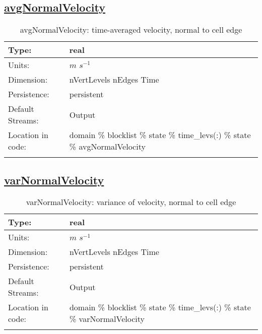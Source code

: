 \subsection[avgNormalVelocity]{\hyperref[sec:var_tab_state]{avgNormalVelocity}}
\label{subsec:var_sec_state_avgNormalVelocity}
\begin{center}
\begin{longtable}{| p{2.0in} | p{4.0in} |}
        \hline 
        Type: & real \\
        \hline 
        Units: & $m$ $s^{-1}$ \\
        \hline 
        Dimension: & nVertLevels nEdges Time \\
        \hline 
        Persistence: & persistent \\
        \hline 
		 Default Streams: & Output  \\
        \hline 
		 Location in code: & domain \% blocklist \% state \% time\_levs(:) \% state \% avgNormalVelocity \\
		 \hline 
    \caption{avgNormalVelocity: time-averaged velocity, normal to cell edge}
\end{longtable}
\end{center}
\subsection[varNormalVelocity]{\hyperref[sec:var_tab_state]{varNormalVelocity}}
\label{subsec:var_sec_state_varNormalVelocity}
\begin{center}
\begin{longtable}{| p{2.0in} | p{4.0in} |}
        \hline 
        Type: & real \\
        \hline 
        Units: & $m$ $s^{-1}$ \\
        \hline 
        Dimension: & nVertLevels nEdges Time \\
        \hline 
        Persistence: & persistent \\
        \hline 
		 Default Streams: & Output  \\
        \hline 
		 Location in code: & domain \% blocklist \% state \% time\_levs(:) \% state \% varNormalVelocity \\
		 \hline 
    \caption{varNormalVelocity: variance of velocity, normal to cell edge}
\end{longtable}
\end{center}

